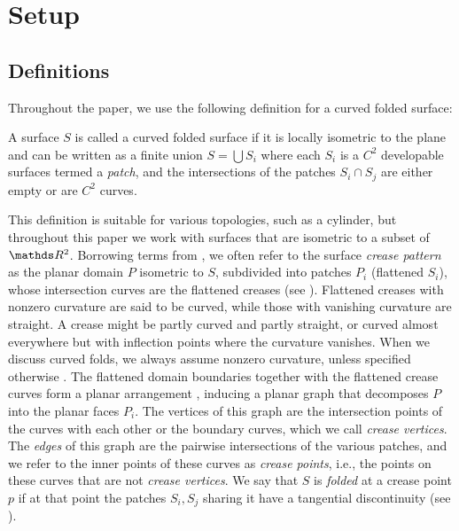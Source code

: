 
\section{Setup} \label{sec:setup}
\subsection{Definitions}
Throughout the paper, we use the following definition for a curved folded surface:
\begin{definition} \label{def:curved_folded_surface}
A surface $S$ is called a curved folded surface if it is locally isometric to the plane and can be written as a finite union $S = \bigcup S_i $ where each $S_i$ is a $C^2$ developable surfaces termed a \emph{patch}, and the intersections of the patches $S_i \cap S_j$ are either empty or are $C^2$ curves.
\end{definition}
This definition is suitable for various topologies, such as a cylinder, but throughout this paper we work with surfaces that are isometric to a subset of $\R^2$. Borrowing terms from \cite{origami_book,non_pleated}, we often refer to the surface \emph{crease pattern} as the planar domain $P$ isometric to $S$, subdivided into patches $P_i$ (flattened $S_i$), whose intersection curves are the flattened creases (see ). Flattened creases with nonzero curvature are said to be curved, while those with vanishing curvature are straight. A crease might be partly curved and partly straight, or curved almost everywhere but with inflection points where the curvature vanishes. When we discuss curved folds, we always assume nonzero curvature, unless specified otherwise . The flattened domain boundaries together with the flattened crease curves form a planar arrangement \cite{arrangements}, inducing a planar graph that decomposes $P$ into the planar faces $P_i$. The vertices of this graph are the intersection points of the curves with each other or the boundary curves, which we call \emph{crease vertices}. The \emph{edges} of this graph are the pairwise intersections of the various patches, and we refer to the inner points of these curves as \emph{crease points}, i.e., the points on these curves that are not \emph{crease vertices}. We say that $S$ is \emph{folded} at a crease point $p$ if at that point the patches $S_i,S_j$ sharing it have a tangential discontinuity (see ).

